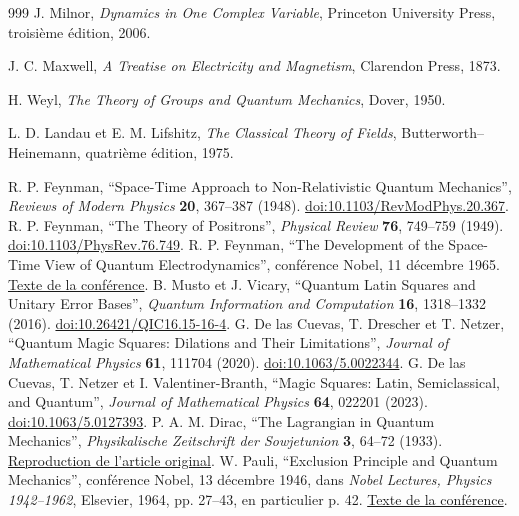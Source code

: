 \begin{thebibliography}{999}
J. Milnor,
\emph{Dynamics in One Complex Variable},
Princeton University Press, troisième édition, 2006.

J. C. Maxwell,
\emph{A Treatise on Electricity and Magnetism},
Clarendon Press, 1873.

H. Weyl,
\emph{The Theory of Groups and Quantum Mechanics},
Dover, 1950.

L. D. Landau et E. M. Lifshitz,
\emph{The Classical Theory of Fields},
Butterworth--Heinemann, quatrième édition, 1975.

 R. P. Feynman, ``Space-Time Approach to Non-Relativistic Quantum Mechanics'', \emph{Reviews of Modern Physics} \textbf{20}, 367--387 (1948). \href{https://doi.org/10.1103/RevModPhys.20.367}{doi:10.1103/RevModPhys.20.367}.
 R. P. Feynman, ``The Theory of Positrons'', \emph{Physical Review} \textbf{76}, 749--759 (1949). \href{https://doi.org/10.1103/PhysRev.76.749}{doi:10.1103/PhysRev.76.749}.
 R. P. Feynman, ``The Development of the Space-Time View of Quantum Electrodynamics'', conférence Nobel, 11 décembre 1965. \href{https://www.nobelprize.org/prizes/physics/1965/feynman/lecture/}{Texte de la conférence}.
 B. Musto et J. Vicary, ``Quantum Latin Squares and Unitary Error Bases'', \emph{Quantum Information and Computation} \textbf{16}, 1318--1332 (2016). \href{https://doi.org/10.26421/QIC16.15-16-4}{doi:10.26421/QIC16.15-16-4}.
 G. De las Cuevas, T. Drescher et T. Netzer, ``Quantum Magic Squares: Dilations and Their Limitations'', \emph{Journal of Mathematical Physics} \textbf{61}, 111704 (2020). \href{https://doi.org/10.1063/5.0022344}{doi:10.1063/5.0022344}.
 G. De las Cuevas, T. Netzer et I. Valentiner-Branth, ``Magic Squares: Latin, Semiclassical, and Quantum'', \emph{Journal of Mathematical Physics} \textbf{64}, 022201 (2023). \href{https://doi.org/10.1063/5.0127393}{doi:10.1063/5.0127393}.
 P. A. M. Dirac, ``The Lagrangian in Quantum Mechanics'', \emph{Physikalische Zeitschrift der Sowjetunion} \textbf{3}, 64--72 (1933). \href{https://www.informationphilosopher.com/solutions/scientists/dirac/Lagrangian_1933.pdf}{Reproduction de l'article original}.
 W. Pauli, ``Exclusion Principle and Quantum Mechanics'', conférence Nobel, 13 décembre 1946, dans \emph{Nobel Lectures, Physics 1942--1962}, Elsevier, 1964, pp. 27--43, en particulier p. 42. \href{https://www.nobelprize.org/uploads/2018/06/pauli-lecture.pdf}{Texte de la conférence}.

\end{thebibliography}
